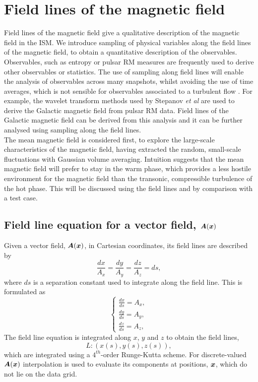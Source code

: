 \documentclass[useAMS,usenatbib]{mn2e}
\begin{document}
\section[]{Field lines of the magnetic field}
Field lines of the magnetic field give a qualitative description of the magnetic field in the ISM. We introduce sampling of physical variables along the field lines of the magnetic field, to obtain a quantitative description of the observables. Observables, such as entropy or pulsar RM measures \citep{SSFS02} are frequently used to derive other observables or statistics.  The use of sampling along field lines will enable the analysis of observables across many snapshots, whilst avoiding the use of time averages, which is not sensible for observables associated to a turbulent flow \citep{TL72}. For example, the wavelet transform methods used by Stepanov \textsl{et al} \citep{st02} are used to derive the Galactic magnetic field from pulsar RM data. Field lines of the Galactic magnetic field can be derived from this analysis and it can be further analysed using sampling along the field lines.\\
The mean magnetic field is considered first, to explore the large-scale characteristics of the magnetic field, having extracted the random, small-scale fluctuations with Gaussian volume averaging.  Intuition suggests that the mean magnetic field will prefer to stay in the warm phase, which provides a less hostile environment for the magnetic field than the transonic, compressible turbulence of the hot phase. This will be discussed using the field lines and by comparison with a test case.
\boldmath
\subsection{Field line equation for a vector field, $\boldsymbol{A}(\boldsymbol{x})$}
\unboldmath
Given a vector field, $\boldsymbol{A}(\boldsymbol{x})$, in Cartesian coordinates, its field lines are described by
\begin{equation}
\frac{dx}{A_{x}}=\frac{dy}{A_{y}}=\frac{dz}{A_{z}}=ds,
\label{f_lines_eqn}
\end{equation}
where $ds$ is a separation constant used to integrate along the field line. This is formulated as
\begin{equation}
\begin{cases}
\frac{dx}{ds}=A_x,\\
\frac{dy}{ds}=A_y,\\
\frac{dz}{ds}=A_z,
\end{cases}
\label{fld_eqns}
\end{equation}
 The field line equation is integrated along $x$, $y$ and $z$ to obtain the field lines,
\[L: (x(s),y(s),z(s)),\]
which are integrated using a $4^{th}$-order Runge-Kutta scheme. For discrete-valued $\boldsymbol{A}(\boldsymbol{x})$ interpolation is used to evaluate its components at positions, $\boldsymbol{x}$, which do not lie on the data grid. 
\end{document}
